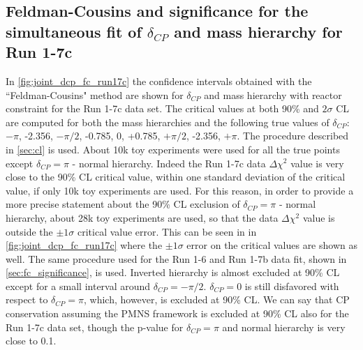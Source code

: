 %
%

\subsection {Feldman-Cousins and significance for the simultaneous fit of $\delta_{CP}$ and mass hierarchy for Run 1-7c}
\label{sec:fc_significance_run17c}


In \cref{fig:joint_dcp_fc_run17c} the confidence intervals obtained with the ``Feldman-Cousins" method
are shown for $\delta_{CP}$ and mass hierarchy with reactor constraint for the Run 1-7c data set.
The critical values at both 90\% and $2\sigma$ CL are computed
for both the mass hierarchies and the following true values of $\delta_{CP}$: 
$-\pi$, -2.356, $-\pi/2$, -0.785, 0, +0.785, $+\pi/2$, -2.356, $+\pi$. 
The procedure described in \cref{sec:cl} is used.
About 10k toy experiments were used for all the true points except $\delta_{CP} = \pi$ - normal hierarchy.
Indeed the Run 1-7c data $\Delta \chi^2$ value is very close to the 90\% CL critical value, within one standard deviation of the critical value,
if only 10k toy experiments are used. 
For this reason, in order to provide a more precise statement about the 
90\% CL exclusion of $\delta_{CP} = \pi$ - normal hierarchy, about 28k toy experiments are used, 
so that the data $\Delta \chi^2$ value is outside the $\pm 1 \sigma$ critical value error.
This can be seen in in \cref{fig:joint_dcp_fc_run17c}
where the $\pm 1 \sigma$ error on the critical values are shown as well.
The same procedure used for the Run 1-6 and Run 1-7b data fit, shown in \cref{sec:fc_significance}, is used.
Inverted hierarchy is almost excluded at 90\% CL except for a small interval around $\delta_{CP} = -\pi / 2$.
$\delta_{CP} = 0$ is still disfavored with respect to $\delta_{CP} = \pi$, which, however, is excluded at 90\% CL. 
We can say that CP conservation assuming the PMNS framework is excluded at 90\% CL also for the Run 1-7c data set,
though the p-value for $\delta_{CP} = \pi$ and normal hierarchy is very close to 0.1. 

